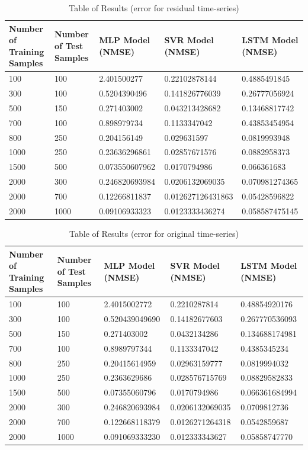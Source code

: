 \documentclass{article}
\begin{document}
\begin{table}[ht]
	\centering
	\begin{tabular}{p{2cm} p{2cm} p{2cm} p{2cm} p{2cm}}
		\toprule
		Number of Training Samples & Number of Test Samples & MLP Model (NMSE) & SVR Model (NMSE) & LSTM Model (NMSE) \\
		\midrule
		100 & 100 & 2.401500277 & 0.22102878144 & 0.4885491845 \\
		\midrule
		300 & 100 & 0.5204390496 & 0.141826776039 & 0.26777056924 \\
		\midrule
		500 & 150 & 0.271403002 & 0.043213428682 & 0.13468817742 \\
		\midrule
		700 & 100 & 0.898979734 & 0.1133347042 & 0.43853454954 \\
		\midrule
		800 & 250 & 0.204156149 & 0.029631597 & 0.0819993948 \\
		\midrule
		1000 & 250 & 0.23636296861 & 0.02857671576 & 0.0882958373 \\
		\midrule
		1500 & 500 & 0.073550607962 & 0.0170794986 & 0.066361683 \\
		\midrule
		2000 & 300 & 0.246820693984 & 0.0206132069035 & 0.070981274365 \\
		\midrule
		2000 & 700 & 0.12266811837 & 0.012627126431863 & 0.05428596822 \\
		\midrule
		2000 & 1000 & 0.09106933323 &  0.0123333436274 & 0.058587475145 \\
		\bottomrule
	\end{tabular}
	\caption{Table of Results (error for residual time-series)}
\end{table}

\begin{table}[ht]
	\centering
	\begin{tabular}{p{2cm} p{2cm} p{2cm} p{2cm} p{2cm}}
		\toprule
		Number of Training Samples & Number of Test Samples & MLP Model (NMSE) & SVR Model (NMSE) & LSTM Model (NMSE) \\
		\midrule
		100 & 100 & 2.4015002772 & 0.2210287814 & 0.48854920176 \\
		\midrule
		300 & 100 & 0.520439049690 & 0.14182677603 & 0.267770536093 \\ 
		\midrule
		500 & 150 & 0.271403002 & 0.0432134286 & 0.134688174981 \\
		\midrule
		700 & 100 & 0.8989797344 & 0.1133347042 & 0.4385345234 \\
		\midrule
		800 & 250 & 0.20415614959 & 0.02963159777 & 0.0819994032 \\
		\midrule
		1000 & 250 & 0.2363629686  & 0.028576715769 & 0.08829582833 \\
		\midrule
		1500 & 500 & 0.07355060796 & 0.0170794986 & 0.066361684994 \\
		\midrule
		2000 & 300 & 0.246820693984 & 0.0206132069035 & 0.0709812736 \\
		\midrule
		2000 & 700 & 0.122668118379 & 0.0126271264318 & 0.0542859687 \\
		\midrule
		2000 & 1000 & 0.091069333230 & 0.012333343627 & 0.05858747770 \\
		\bottomrule
	\end{tabular} \caption{Table of Results (error for original time-series)}
\end{table}
\end{document}
